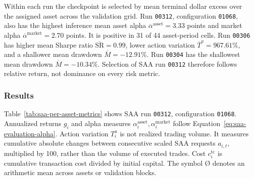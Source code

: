 Within each run the checkpoint is selected by mean terminal dollar excess over the assigned asset across the validation grid. Run \texttt{00312}, configuration \texttt{01068}, also has the highest inference mean asset alpha \(\overline\alpha^{\mathrm{asset}}=3.33\) points and market alpha \(\overline\alpha^{\mathrm{market}}=2.70\) points. It is positive in 31 of 44 asset-period cells. Run \texttt{00306} has higher mean Sharpe ratio \(\overline{\mathrm{SR}}=0.99\), lower action variation \(\overline T^a=967.61\%\), and a shallower mean drawdown \(\overline M=-12.91\%\). Run \texttt{00304} has the shallowest mean drawdown \(\overline M=-10.34\%\). Selection of SAA run \texttt{00312} therefore follows relative return, not dominance on every risk metric.


\subsubsection{Results}
\label{sec:saa-results-presentation}

Table~\ref{tab:saa-per-asset-metrics} shows SAA run \texttt{00312}, configuration \texttt{01068}. Annualized returns \(g_i\) and alpha measures \(\alpha_i^{\mathrm{asset}},\alpha_i^{\mathrm{market}}\) follow Equation~\eqref{eq:saa-evaluation-alpha}. Action variation \(T_i^a\) is not realized trading volume. It measures cumulative absolute changes between consecutive scaled SAA requests \(a_{i,t}\), multiplied by 100, rather than the volume of executed trades. Cost \(c_i^{\mathrm{tc}}\) is cumulative transaction cost divided by initial capital. The symbol \O{} denotes an arithmetic mean across assets or validation blocks.

